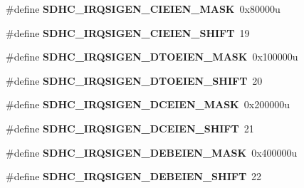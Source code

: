 \begin{DoxyCompactItemize}
\item 
\#define {\bfseries S\+D\+H\+C\+\_\+\+I\+R\+Q\+S\+I\+G\+E\+N\+\_\+\+C\+I\+E\+I\+E\+N\+\_\+\+M\+A\+SK}~0x80000u\hypertarget{group__SDHC__Register__Masks_ga3a09f7cd7b41c260dd89ea77a1511005}{}\label{group__SDHC__Register__Masks_ga3a09f7cd7b41c260dd89ea77a1511005}

\item 
\#define {\bfseries S\+D\+H\+C\+\_\+\+I\+R\+Q\+S\+I\+G\+E\+N\+\_\+\+C\+I\+E\+I\+E\+N\+\_\+\+S\+H\+I\+FT}~19\hypertarget{group__SDHC__Register__Masks_gae0d92453706b49294eac23eb53e2c742}{}\label{group__SDHC__Register__Masks_gae0d92453706b49294eac23eb53e2c742}

\item 
\#define {\bfseries S\+D\+H\+C\+\_\+\+I\+R\+Q\+S\+I\+G\+E\+N\+\_\+\+D\+T\+O\+E\+I\+E\+N\+\_\+\+M\+A\+SK}~0x100000u\hypertarget{group__SDHC__Register__Masks_ga16c82f46bb0de77ecd32731d597843e4}{}\label{group__SDHC__Register__Masks_ga16c82f46bb0de77ecd32731d597843e4}

\item 
\#define {\bfseries S\+D\+H\+C\+\_\+\+I\+R\+Q\+S\+I\+G\+E\+N\+\_\+\+D\+T\+O\+E\+I\+E\+N\+\_\+\+S\+H\+I\+FT}~20\hypertarget{group__SDHC__Register__Masks_ga0d5615f1a4d2d1e8f8897fefbf7c1366}{}\label{group__SDHC__Register__Masks_ga0d5615f1a4d2d1e8f8897fefbf7c1366}

\item 
\#define {\bfseries S\+D\+H\+C\+\_\+\+I\+R\+Q\+S\+I\+G\+E\+N\+\_\+\+D\+C\+E\+I\+E\+N\+\_\+\+M\+A\+SK}~0x200000u\hypertarget{group__SDHC__Register__Masks_ga9993e87c1ebc32e1bf8b58af1460f470}{}\label{group__SDHC__Register__Masks_ga9993e87c1ebc32e1bf8b58af1460f470}

\item 
\#define {\bfseries S\+D\+H\+C\+\_\+\+I\+R\+Q\+S\+I\+G\+E\+N\+\_\+\+D\+C\+E\+I\+E\+N\+\_\+\+S\+H\+I\+FT}~21\hypertarget{group__SDHC__Register__Masks_gae8c36f54cd9d4e06778ddea141252fb5}{}\label{group__SDHC__Register__Masks_gae8c36f54cd9d4e06778ddea141252fb5}

\item 
\#define {\bfseries S\+D\+H\+C\+\_\+\+I\+R\+Q\+S\+I\+G\+E\+N\+\_\+\+D\+E\+B\+E\+I\+E\+N\+\_\+\+M\+A\+SK}~0x400000u\hypertarget{group__SDHC__Register__Masks_gac596000fbd2ef20a87022ab4abbeb74a}{}\label{group__SDHC__Register__Masks_gac596000fbd2ef20a87022ab4abbeb74a}

\item 
\#define {\bfseries S\+D\+H\+C\+\_\+\+I\+R\+Q\+S\+I\+G\+E\+N\+\_\+\+D\+E\+B\+E\+I\+E\+N\+\_\+\+S\+H\+I\+FT}~22\hypertarget{group__SDHC__Register__Masks_gac5c0c4b875fe244d9746cb09df94e6aa}{}\label{group__SDHC__Register__Masks_gac5c0c4b875fe244d9746cb09df94e6aa}


\end{DoxyCompactItemize}
